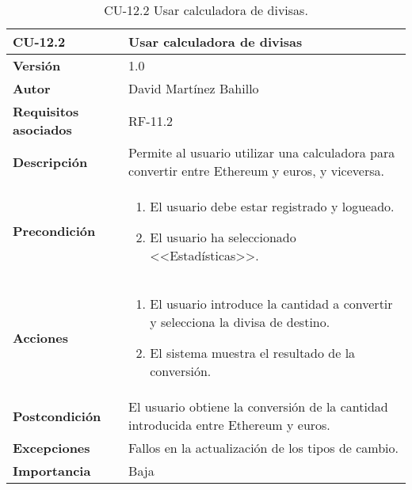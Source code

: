 \begin{table}[p]
	\centering
	\begin{tabularx}{\linewidth}{ p{} p{} }
		\toprule
		\textbf{CU-12.2}  & \textbf{Usar calculadora de divisas}\\
		\midrule
		\textbf{Versión}              & 1.0    \\
		\textbf{Autor}                & David Martínez Bahillo \\
		\textbf{Requisitos asociados} & RF-11.2 \\
		\textbf{Descripción}          & Permite al usuario utilizar una calculadora para convertir entre Ethereum y euros, y viceversa. \\
		\textbf{Precondición}         &  
		\begin{enumerate}
			\item El usuario debe estar registrado y logueado.
			\item El usuario ha seleccionado <<Estadísticas>>.
		\end{enumerate}\\
		\textbf{Acciones}             &
		\begin{enumerate}
			\item El usuario introduce la cantidad a convertir y selecciona la divisa de destino.
			\item El sistema muestra el resultado de la conversión.
		\end{enumerate}\\
		\textbf{Postcondición}        & El usuario obtiene la conversión de la cantidad introducida entre Ethereum y euros. \\
		\textbf{Excepciones}          & Fallos en la actualización de los tipos de cambio. \\
		\textbf{Importancia}          & Baja \\
		\bottomrule
	\end{tabularx}
	\caption{CU-12.2 Usar calculadora de divisas.}
\end{table}